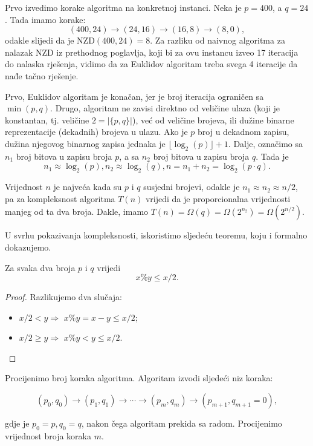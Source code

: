 \begin{example}
	Prvo izvedimo korake algoritma na konkretnoj instanci. Neka je $p=400$, a $q=24$. Tada imamo korake:
	$$(400, 24) \rightarrow (24, 16) \rightarrow (16, 8) \rightarrow (8, 0),$$
	odakle slijedi da je NZD$(400, 24)=8$. Za razliku od naivnog algoritma za nalazak NZD iz prethodnog poglavlja, koji bi za ovu instancu izveo 17 iteracija do nalaska rješenja, vidimo da za Euklidov algoritam treba svega 4 iteracije da nađe tačno rješenje. 
	
	Prvo, Euklidov algoritam je konačan, jer je broj iteracija ograničen sa $\min(p, q)$. Drugo, algoritam ne zavisi direktno od veličine ulaza (koji je konstantan, tj. veličine $2=|\{p, q\}|$), već od veličine brojeva, ili dužine binarne reprezentacije (dekadnih) brojeva u ulazu. Ako je $p$ broj u dekadnom zapisu, dužina njegovog binarnog zapisa jednaka je $\lfloor \log_2(p) \rfloor+1$. Dalje, označimo sa $n_1$   broj bitova u zapisu broja $p$, a sa $n_2$  broj bitova u zapisu broja $q$. 
	Tada je
	$$n_1 \approx \log_2(p), n_2 \approx \log_2(q),  n = n_1 + n_2 = \log_2(p \cdot q ).$$
	
	Vrijednost $n$ je najveća kada su $p$ i $q$ susjedni brojevi, odakle je $ n_1 \approx n_2 \approx n/2$,  pa za kompleksnost algoritma $T(n)$ vrijedi da je proporcionalna vrijednosti manjeg od
	ta dva broja.  
	Dakle, imamo $T(n)  = \Omega(q) = \Omega(2^{n_2}) =  \Omega(2^{n/2})$.
	
	U svrhu pokazivanja kompleksnosti, iskoristimo sljedeću teoremu, koju i formalno dokazujemo. 
	\begin{theorem}
		 Za svaka dva broja $p$ i $q$ vrijedi
		 $$ x \% y \leq x / 2.$$
	\end{theorem}
	 
	 \begin{proof}
	 	Razlikujemo dva slučaja:
	 	\begin{itemize}
	 		\item $x/2 < y \Rightarrow$  $x\%y = x  - y  \leq x/2 $;
            \item $x/2 \geq  y\Rightarrow$ $x\% y < y \leq x / 2$.
	 	\end{itemize}
	 \end{proof}
	
Procijenimo broj koraka algoritma. Algoritam izvodi sljedeći niz koraka:

$$(p_0,  q_0 ) \rightarrow (p_1, q_1) \rightarrow \cdots \rightarrow (p_m,q_m ) \rightarrow (p_{m+1}, q_{m+1}=0),$$	
	
	gdje je $p_0 = p, q_0 = q$, nakon čega algoritam prekida sa radom. Procijenimo vrijednost broja koraka $m$. 
	

\end{example}
